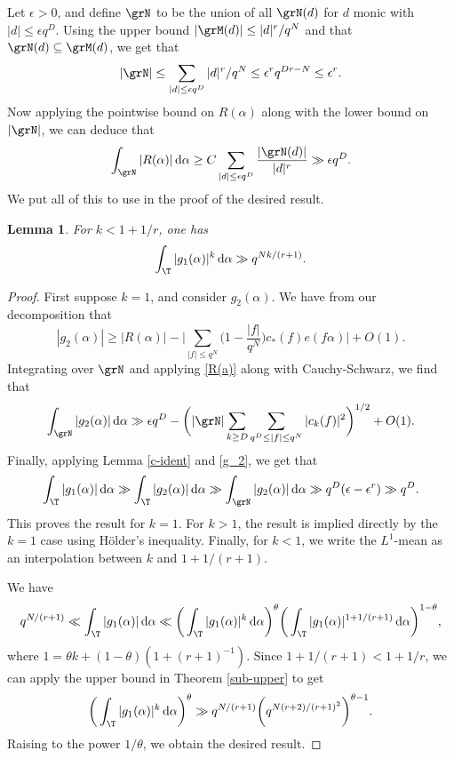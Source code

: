 \documentclass[reqno,11pt]{amsart}
\newtheorem{lemma}[theorem]{Lemma}
\theoremstyle{definition}
\theoremstyle{remark}
\numberwithin{equation}{section}
\renewcommand{\d}{\,{\rm d}} %
\newcommand{\<}{\begin{equation}}
\renewcommand{\>}{\end{equation}}
\begin{document}
Let $\epsilon>0$, and define $\grN$ to be the union of all $\grN(d)$ for $d$ monic with $|d|\leq \epsilon q^D$. Using the upper bound $|\grM(d)| \leq |d|^r/q^N$ and that $\grN(d) \subseteq \grM(d)$, we get that
\[|\grN| \leq \sum_{|d|\leq \epsilon q^D}|d|^r/q^N \leq \epsilon^r q^{Dr-N} \leq \epsilon^r.\]
Now applying the pointwise bound on $R(\alpha)$ along with the lower bound on $|\grN|$, we can deduce that
\<\label{R(a)}
\int_\grN |R(\alpha)|\d\alpha \geq C\sum_{|d| \leq \epsilon q^D}\dfrac{|\grN(d)|}{|d|^r} \gg \epsilon q^D.
\>
We put all of this to use in the proof of the desired result. 
\begin{lemma}\label{L1-lower}
    For $k<1+1/r$, one has
    \[\int_\T |g_1(\alpha)|^k \d\alpha \gg q^{Nk/(r+1)}.\]
\end{lemma}
\begin{proof}
    First suppose $k = 1$, and consider $g_2(\alpha)$. We have from our decomposition that
    \[|g_2(\alpha)| \geq |R(\alpha)| - \bigg|\sum_{|f| \leq q^N} \bigg(1-\dfrac{|f|}{q^N}\bigg)c_*(f) e(f\alpha)\bigg| + O(1).\]
    Integrating over $\grN$ and applying \eqref{R(a)} along with Cauchy-Schwarz, we find that
    \[\int_\grN |g_2(\alpha)|\d\alpha \gg \epsilon q^D - \bigg(|\grN|\sum_{k\geq D} \sum_{q^D \leq |f| \leq q^N} |c_k(f)|^2\bigg)^{1/2} + O(1).\]
    Finally, applying Lemma \ref{c-ident} and \eqref{g_2}, we get that
    \[\int_\T |g_1(\alpha)| \d \alpha \gg \int_\T |g_2(\alpha)| \d \alpha \gg \int_\grN |g_2(\alpha)| \d \alpha \gg q^D(\epsilon - \epsilon^r) \gg q^D.\]
    This proves the result for $k = 1$. For $k>1$, the result is implied directly by the $k=1$ case using H\"older's inequality. Finally, for $k<1$, we write the $L^1$-mean as an interpolation between $k$ and $1+1/(r+1)$. 
    
    We have
    \[q^{N/(r+1)} \ll \int_\T|g_1(\alpha)|\d\alpha \ll \bigg(\int_\T |g_1(\alpha)|^k\d\alpha\bigg)^{\theta}\bigg(\int_\T |g_1(\alpha)|^{1+1/(r+1)}\d\alpha\bigg)^{1-\theta},\]
    where $1 = \theta k + (1-\theta)(1+(r+1)^{-1})$. Since $1+1/(r+1)<1+1/r$, we can apply the upper bound in Theorem \ref{sub-upper} to get
    \[\bigg(\int_\T |g_1(\alpha)|^k\d\alpha\bigg)^{\theta}\gg q^{N/(r+1)}\bigg(q^{N(r+2)/(r+1)^2}\bigg)^{\theta-1}.\]
    Raising to the power $1/\theta$, we obtain the desired result.
\end{proof}
\end{document}
